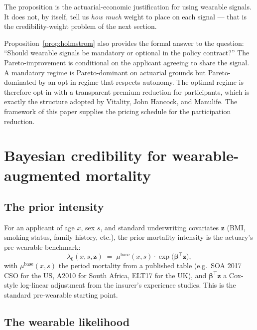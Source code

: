 The proposition is the actuarial-economic justification for using
wearable signals. It does not, by itself, tell us \emph{how much}
weight to place on each signal --- that is the credibility-weight
problem of the next section.

\begin{nbox}
Proposition~\ref{prop:holmstrom} also provides the formal answer to
the question: ``Should wearable signals be mandatory or optional in
the policy contract?'' The Pareto-improvement is conditional on the
applicant agreeing to share the signal. A mandatory regime is
Pareto-dominant on actuarial grounds but Pareto-dominated by an
opt-in regime that respects autonomy. The optimal regime is therefore
opt-in with a transparent premium reduction for participants, which
is exactly the structure adopted by Vitality, John Hancock, and
Manulife. The framework of this paper supplies the pricing schedule
for the participation reduction.
\end{nbox}

\section{Bayesian credibility for wearable-augmented mortality}\label{sec:credibility}

\subsection{The prior intensity}\label{ss:prior}

For an applicant of age $x$, sex $s$, and standard underwriting
covariates $\mathbf{z}$ (BMI, smoking status, family history, etc.),
the prior mortality intensity is the actuary's pre-wearable
benchmark:
\begin{equation}\label{eq:prior}
   \lambda_0(x,s,\mathbf{z}) \;=\;
   \mu^{\mathrm{base}}(x,s) \cdot \exp\!\bigl(\bm{\beta}^\top \mathbf{z}\bigr),
\end{equation}
with $\mu^{\mathrm{base}}(x,s)$ the period mortality from a published
table (e.g.\ SOA 2017 CSO for the US, A2010 for South Africa, ELT17
for the UK), and $\bm{\beta}^\top\mathbf{z}$ a Cox-style log-linear
adjustment from the insurer's experience studies. This is the
standard pre-wearable starting point.

\subsection{The wearable likelihood}\label{ss:lik}

